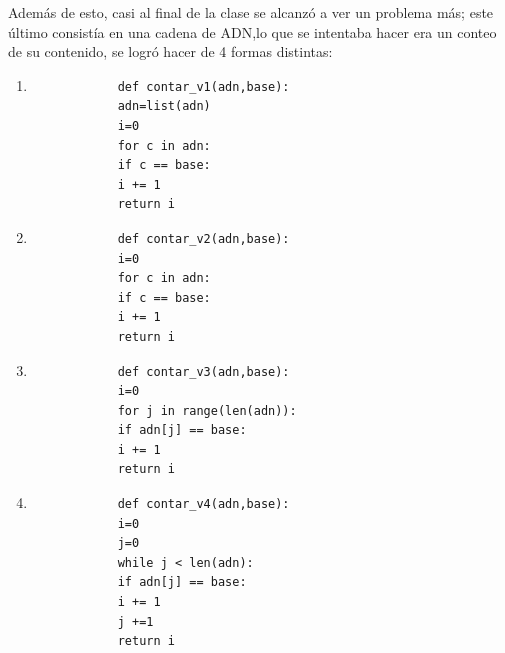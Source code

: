 \documentclass{article}
\begin{document}
	Además de esto, casi al final de la clase se alcanzó a ver un problema más; este último consistía en una cadena de ADN,lo que se intentaba hacer era un conteo de su contenido, se logró hacer de 4 formas distintas:
	\begin{enumerate}
		\item 
		\begin{verbatim}
			def contar_v1(adn,base):
			adn=list(adn)
			i=0
			for c in adn:
			if c == base:
			i += 1
			return i
		\end{verbatim}
		\item 
		\begin{verbatim}
			def contar_v2(adn,base):
			i=0
			for c in adn:
			if c == base:
			i += 1
			return i
		\end{verbatim}
		\item 
		\begin{verbatim}
			def contar_v3(adn,base):
			i=0
			for j in range(len(adn)):
			if adn[j] == base:
			i += 1
			return i
		\end{verbatim}
		\item
		\begin{verbatim} 
			def contar_v4(adn,base):
			i=0
			j=0
			while j < len(adn):
			if adn[j] == base:
			i += 1
			j +=1
			return i
		\end{verbatim}
	\end{enumerate}
	
\end{document}
